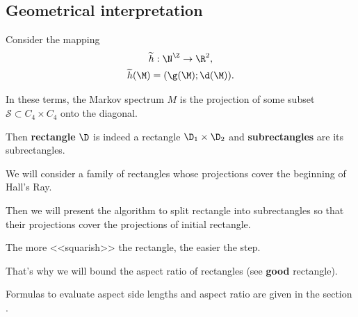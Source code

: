 \subsection{Geometrical interpretation}

Consider the mapping 
\begin{gather*}
	\widetilde{h}: \N^\Z \rightarrow \R^2,\\
	\widetilde{h}(\M) = (\g(\M); \d(\M)).
\end{gather*}

In these terms,
the Markov spectrum $M$
is the projection of some subset $\mathcal{S} \subset C_4 \times C_4$ onto the diagonal.

Then \textbf{rectangle} $\D$ is indeed a rectangle $\D_1 \times \D_2$
and \textbf{subrectangles} are its subrectangles.

We will consider a family of rectangles whose projections cover the beginning of Hall's Ray.

Then we will present the algorithm to split rectangle into subrectangles
so that their projections cover the projections of initial rectangle.

The more <<squarish>> the rectangle, the easier the step.

That's why we will bound the aspect ratio of rectangles (see \textbf{good} rectangle).

Formulas to evaluate aspect side lengths and aspect ratio
are given in the section .
